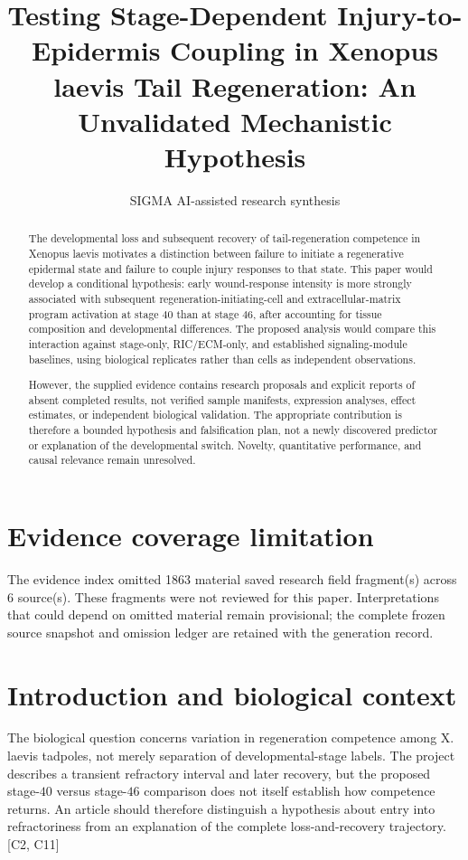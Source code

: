 \documentclass[11pt]{article}
\title{Testing Stage-Dependent Injury-to-Epidermis Coupling in Xenopus laevis Tail Regeneration: An Unvalidated Mechanistic Hypothesis}
\date{}
\author{SIGMA AI-assisted research synthesis}
\begin{document}
\maketitle

\begin{abstract}
The developmental loss and subsequent recovery of tail-regeneration competence in Xenopus laevis motivates a distinction between failure to initiate a regenerative epidermal state and failure to couple injury responses to that state. This paper would develop a conditional hypothesis: early wound-response intensity is more strongly associated with subsequent regeneration-initiating-cell and extracellular-matrix program activation at stage $40$ than at stage $46$, after accounting for tissue composition and developmental differences. The proposed analysis would compare this interaction against stage-only, RIC/ECM-only, and established signaling-module baselines, using biological replicates rather than cells as independent observations.

However, the supplied evidence contains research proposals and explicit reports of absent completed results, not verified sample manifests, expression analyses, effect estimates, or independent biological validation. The appropriate contribution is therefore a bounded hypothesis and falsification plan, not a newly discovered predictor or explanation of the developmental switch. Novelty, quantitative performance, and causal relevance remain unresolved.
\end{abstract}
\section*{Evidence coverage limitation}
The evidence index omitted 1863 material saved research field fragment(s) across 6 source(s). These fragments were not reviewed for this paper. Interpretations that could depend on omitted material remain provisional; the complete frozen source snapshot and omission ledger are retained with the generation record.
\section{Introduction and biological context}
The biological question concerns variation in regeneration competence among X. laevis tadpoles, not merely separation of developmental-stage labels. The project describes a transient refractory interval and later recovery, but the proposed stage-$40$ versus stage-$46$ comparison does not itself establish how competence returns. An article should therefore distinguish a hypothesis about entry into refractoriness from an explanation of the complete loss-and-recovery trajectory. [C2, C11]
\end{document}
